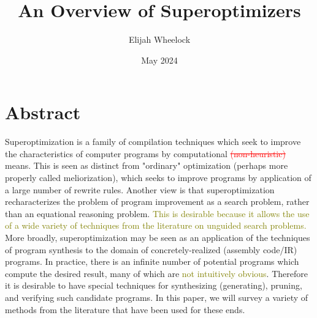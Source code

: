 \documentclass[12pt,twoside]{reedthesis}
\title{An Overview of Superoptimizers}
\author{Elijah Wheelock}
\date{May 2024}
\newcommand{\red}[1]{\textcolor{red}{#1}}
\newcommand{\green}[1]{\textcolor{olive}{#1}}
\newcommand{\addressed}[2]{{#1}}
\begin{document}
\maketitle
\frontmatter %
\pagestyle{empty} %
\tableofcontents

\chapter*{Abstract} %

Superoptimization is a family of compilation techniques which seek to improve the characteristics of computer programs by computational \red{\sout{(non-heuristic)}} means.
This is seen as distinct from "ordinary" optimization (perhaps more properly called meliorization), which seeks to improve programs by application of a large number of rewrite rules.
Another view is that superoptimization recharacterizes the problem of program improvement as a search problem, rather than an equational reasoning problem.
\green{This is desirable because it allows the use of a wide variety of techniques from the literature on unguided search problems.}
More broadly, superoptimization may be seen as an application of the techniques of program synthesis to the domain of concretely-realized (assembly code/IR) programs.
In practice, there is an infinite number of potential programs which compute the desired result, many of which are \green{not intuitively obvious}.
Therefore it is desirable to have special techniques for synthesizing (generating), pruning, and verifying such candidate programs. 
In this paper, we will survey a variety of methods from the literature that have been used for these ends.
\end{document}
